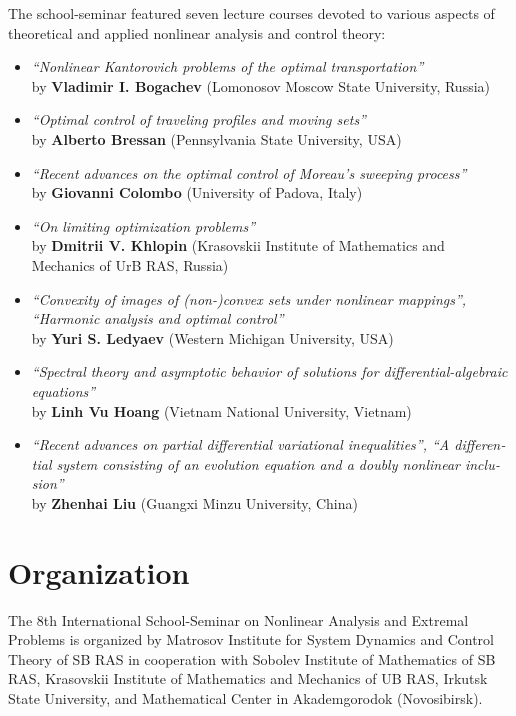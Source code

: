 \documentclass[12pt,final]{llncs}
\begin{document}
\begin{english}
\begin{itemize}
\end{itemize}
The school-seminar featured seven lecture courses devoted to various aspects of theoretical and applied nonlinear analysis and control theory:
\begin{itemize}
\item \emph{``Nonlinear Kantorovich problems of the optimal transportation''}\\ by  \textbf{Vladimir I. Bogachev} (Lomonosov Moscow State University, Russia)\smallskip
\item \emph{``Optimal control of traveling profiles and moving sets''}\\ by  \textbf{Alberto Bressan} (Pennsylvania State University, USA)\smallskip
\item \emph{``Recent advances on the optimal control of Moreau's sweeping process''}\\ by \textbf{Giovanni Colombo} (University of Padova, Italy)\smallskip
\item \emph{``On limiting optimization problems''}\\ by  \textbf{Dmitrii V. Khlopin} (Krasovskii Institute of Mathematics and Mechanics of UrB RAS, Russia)\smallskip
\item \emph{``Convexity of images of (non-)convex sets under nonlinear mappings'', ``Harmonic analysis and optimal control''}\\ by \textbf{Yuri S. Ledyaev} (Western Michigan University, USA)\smallskip
\item \emph{``Spectral theory and asymptotic behavior of solutions for differential-algebraic equations''}\\ by \textbf{Linh Vu Hoang} (Vietnam National University, Vietnam)\smallskip
\item \emph{``Recent advances on partial differential variational inequalities'', ``A differential system consisting of an evolution equation and a doubly nonlinear inclusion''}\\ by \textbf{Zhenhai Liu} (Guangxi Minzu University, China)\smallskip
\end{itemize}

\end{english}

%
\chapter*{Organization}
\vspace{-2em}
 \begin{englisharticle}
The 8th International School-Seminar on Nonlinear Analysis and Extremal Problems is organized by Matrosov
Institute for System Dynamics and Control Theory of SB RAS in cooperation with
Sobolev Institute of Mathematics  of SB RAS,
  Krasovskii Institute of Mathematics and Mechanics of UB RAS,
 	Irkutsk State University, and Mathematical Center in Akademgorodok (Novosibirsk).
 \end{englisharticle}
\end{document}
